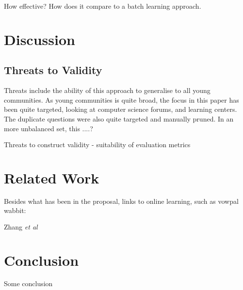 \documentclass[journal,12pt,onecolumn,draftclsnofoot,]{IEEEtran}
\begin{document}
How effective? How does it compare to a batch learning approach.

\section{Discussion}

\subsection{Threats to Validity}

Threats include the ability of this approach to generalise to all young communities. As young communities is quite broad, the focus in this paper has been quite targeted, looking at computer science forums, and learning centers. The duplicate questions were also quite targeted and manually pruned. In an more unbalanced set, this ....?

Threats to construct validity - suitability of evaluation metrics

\section{Related Work}

Besides what has been in the proposal, links to online learning, such as vowpal wabbit:

Zhang \emph{et al}\cite{dupred} 

\section{Conclusion}


Some conclusion






%
\end{document}
